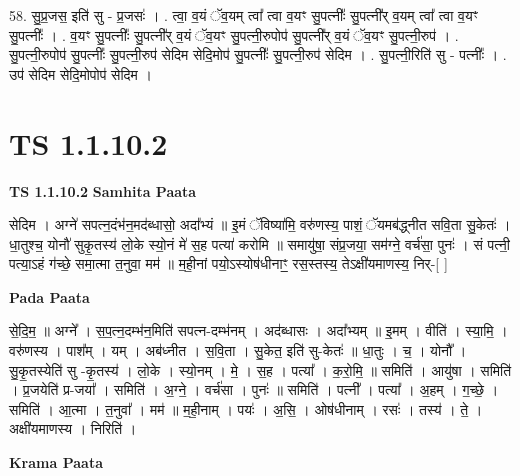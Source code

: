 \documentclass[17pt]{extarticle}
\begin{document}
58. सु॒प्र॒जस॒ इति॑ सु - प्र॒जसः॑ । . त्वा॒ व॒यं ॅव॒यम् त्वा᳚ त्वा व॒यꣳ सु॒पत्नीः᳚ सु॒पत्नी᳚र् व॒यम् त्वा᳚ त्वा व॒यꣳ सु॒पत्नीः᳚ । . व॒यꣳ सु॒पत्नीः᳚ सु॒पत्नी᳚र् व॒यं ॅव॒यꣳ सु॒पत्नी॒रुपोप॑ सु॒पत्नी᳚र् व॒यं ॅव॒यꣳ सु॒पत्नी॒रुप॑ । . सु॒पत्नी॒रुपोप॑ सु॒पत्नीः᳚ सु॒पत्नी॒रुप॑ सेदिम सेदि॒मोप॑ सु॒पत्नीः᳚ सु॒पत्नी॒रुप॑ सेदिम । . सु॒पत्नी॒रिति॑ सु - पत्नीः᳚ । . उप॑ सेदिम सेदि॒मोपोप॑ सेदिम । \newline
\pagebreak
{}
\section*{ TS 1.1.10.2 }

\textbf{TS 1.1.10.2 } \newline
\textbf{Samhita Paata} \newline

सेदिम । अग्ने॑ सपत्न॒दंभ॑न॒मद॑ब्धासो॒ अदा᳚भ्यं ॥ इ॒मं ॅविष्या॑मि॒ वरु॑णस्य॒ पाशं॒ ॅयमब॑द्ध्नीत सवि॒ता सु॒केतः॑ । धा॒तुश्च॒ योनौ॑ सुकृ॒तस्य॑ लो॒के स्यो॒नं मे॑ स॒ह पत्या॑ करोमि ॥ समायु॑षा॒ संप्र॒जया॒ सम॑ग्ने॒ वर्च॑सा॒ पुनः॑ । सं पत्नी॒ पत्या॒ऽहं ग॑च्छे॒ समा॒त्मा त॒नुवा॒ मम॑ ॥ म॒ही॒नां पयो॒ऽस्योष॑धीनाꣳ॒॒ रस॒स्तस्य॒ तेऽक्षी॑यमाणस्य॒ निर्-[ ] \newline

\textbf{Pada Paata} \newline

से॒दि॒म॒ ॥ अग्ने᳚ । स॒प॒त्न॒दम्भ॑न॒मिति॑ सपत्न-दम्भ॑नम् । अद॑ब्धासः । अदा᳚भ्यम् ॥ इ॒मम् । वीति॑ । स्या॒मि॒ । वरु॑णस्य । पाश᳚म् । यम् । अब॑ध्नीत । स॒वि॒ता । सु॒केत॒ इति॑ सु-केतः॑ ॥ धा॒तुः । च॒ । योनौ᳚ । सु॒कृ॒तस्येति॑ सु -कृ॒तस्य॑ । लो॒के । स्यो॒नम् । मे॒ । स॒ह । पत्या᳚ । क॒रो॒मि॒ ॥ समिति॑ । आयु॑षा । समिति॑ । प्र॒जयेति॑ प्र-जया᳚ । समिति॑ । अ॒ग्ने॒ । वर्च॑सा । पुनः॑ ॥ समिति॑ । पत्नी᳚ । पत्या᳚ । अ॒हम् । ग॒च्छे॒ । समिति॑ । आ॒त्मा । त॒नुवा᳚ । मम॑ ॥ म॒ही॒नाम् । पयः॑ । अ॒सि॒ । ओष॑धीनाम् । रसः॑ । तस्य॑ । ते॒ । अक्षी॑यमाणस्य । निरिति॑ ।  \newline


\textbf{Krama Paata} \newline
\end{document}
